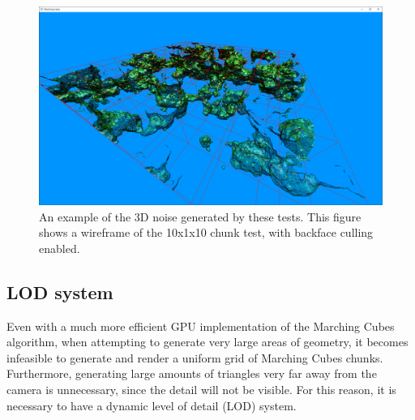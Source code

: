 \documentclass{article}
\begin{document}
\begin{figure}[H]
  \includegraphics[width=\textwidth]{10x10_wireframe.png}
  \caption{An example of the 3D noise generated by these tests. This figure shows a wireframe of the 10x1x10 chunk test, with backface culling enabled.}
\end{figure}

\subsection{LOD system}
Even with a much more efficient GPU implementation of the Marching Cubes algorithm, when attempting to generate very large areas of geometry, it becomes infeasible to generate and render a uniform grid of Marching Cubes chunks. Furthermore, generating large amounts of triangles very far away from the camera is unnecessary, since the detail will not be visible. For this reason, it is necessary to have a dynamic level of detail (LOD) system.
\end{document}

